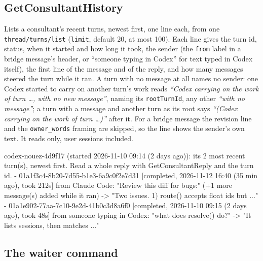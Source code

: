 \documentclass[10pt,a4paper]{article}
\newcommand{\code}[1]{\texttt{#1}}
\begin{document}
\subsection{GetConsultantHistory}
\label{sec:history}

Lists a consultant's recent turns, newest first, one line each, from one
\code{thread/turns/list} (\code{limit}, default 20, at most 100). Each line gives the turn id,
status, when it started and how long it took, the sender (the \code{from} label in a bridge
message's header, or ``someone typing in Codex'' for text typed in Codex itself), the first line of the
message and of the reply, and how many messages steered the turn while it ran. A turn with no
message at all names no sender: one Codex started to carry on another turn's work reads
\emph{``Codex carrying on the work of turn \ldots, with no new message''}, naming its
\code{rootTurnId}, any other \emph{``with no message''}; a turn with a message and another turn as
its root says \emph{``(Codex carrying on the work of turn \ldots)''} after it. For a bridge
message the revision line and the \code{owner\_words} framing are skipped, so the line shows the
sender's own text. It reads only, user sessions included.
\begin{plain}
codex-nouez-4d9f17 (started 2026-11-10 09:14 (2 days ago)): its 2 most recent turn(s), newest first. Read a whole reply with GetConsultantReply and the turn id.
- 01a1f3c4-8b20-7d55-b1e3-6a9c0f2e7d31 [completed, 2026-11-12 16:40 (35 min ago), took 212s] from Claude Code: "Review this diff for bugs:" (+1 more message(s) added while it ran) -> "Two issues. 1) route() accepts float ids but ..."
- 01a1e902-77aa-7c10-9e2d-41b0c3d8a6f0 [completed, 2026-11-10 09:15 (2 days ago), took 48s] from someone typing in Codex: "what does resolve() do?" -> "It lists sessions, then matches ..."
\end{plain}

\subsection{The waiter command}
\end{document}
